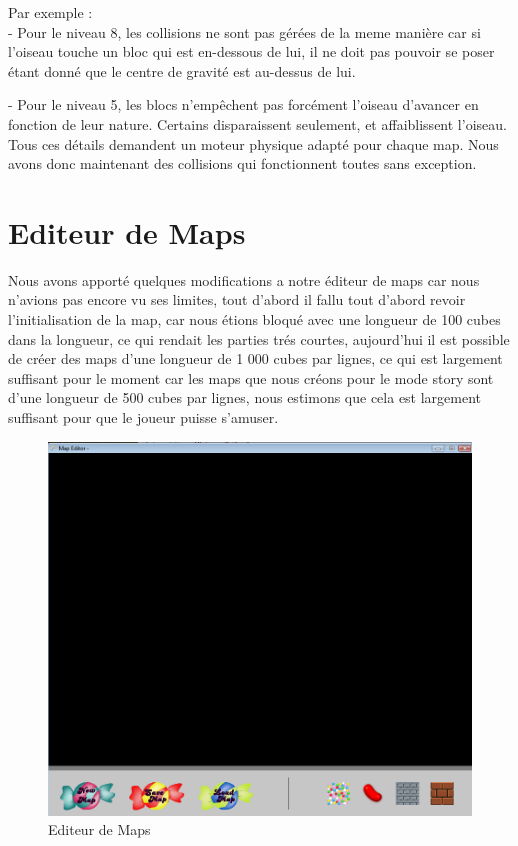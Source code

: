 \documentclass [11pt]{report}
\begin{document}
		\newpage
		
		\noindent Par exemple :\\
		\indent\indent - Pour le niveau 8, les collisions ne sont pas gérées de la meme manière car si l'oiseau touche un bloc qui est en-dessous de lui, il ne doit pas pouvoir se poser étant donné que le centre de gravité est au-dessus de lui.
		
		\indent\indent - Pour le niveau 5, les blocs n'empêchent pas forcément l'oiseau d'avancer en fonction de leur nature. Certains disparaissent seulement, et affaiblissent l'oiseau.\\
		
		
		Tous ces détails demandent un moteur physique adapté pour chaque map. Nous avons donc maintenant des collisions qui fonctionnent toutes sans exception.
		
		\vspace{10mm}
		
	\section{Editeur de Maps}
		Nous avons apporté quelques modifications a notre éditeur de maps car nous n'avions pas encore vu ses limites, tout d'abord il fallu tout d'abord revoir l'initialisation de la map, car nous étions bloqué avec une longueur de 100 cubes dans la longueur, ce qui rendait les parties trés courtes, aujourd'hui il est possible de créer des maps d'une longueur de 1 000 cubes par lignes, ce qui est largement suffisant pour le moment car les maps que nous créons pour le mode story sont d'une longueur de 500 cubes par lignes, nous estimons que cela est largement suffisant pour que le joueur puisse s'amuser.\\
		
		\begin{figure}[h]
			\centering
			\includegraphics[width=0.7\linewidth]{./images/Editeur}
			\caption[Editeur de Maps]{Editeur de Maps}
			\label{fig:Editeur}
		\end{figure}
				
\end{document}

